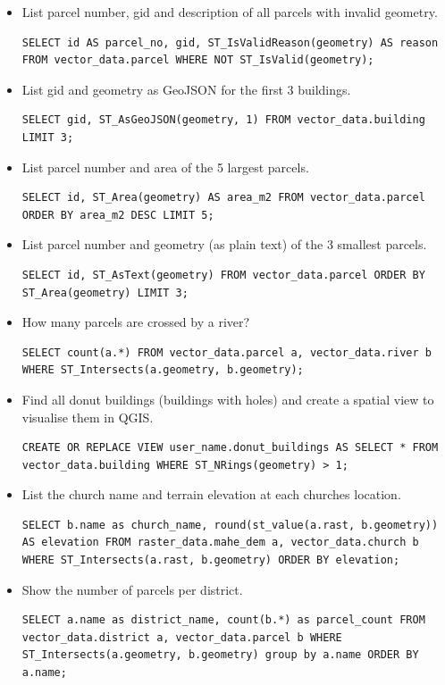 \documentclass[a4paper,12pt,titlepage]{article}
\begin{document}
\begin{itemize}
	\item List parcel number, gid and description of all parcels with invalid geometry.
\begin{lstlisting}
SELECT id AS parcel_no, gid, ST_IsValidReason(geometry) AS reason FROM vector_data.parcel WHERE NOT ST_IsValid(geometry);
\end{lstlisting}
	\item List gid and geometry as GeoJSON for the first 3 buildings.
\begin{lstlisting}
SELECT gid, ST_AsGeoJSON(geometry, 1) FROM vector_data.building LIMIT 3;
\end{lstlisting}
	\item List parcel number and area of the 5 largest parcels.
\begin{lstlisting}
SELECT id, ST_Area(geometry) AS area_m2 FROM vector_data.parcel ORDER BY area_m2 DESC LIMIT 5;
\end{lstlisting}
	\item List parcel number and geometry (as plain text) of the 3 smallest parcels.
\begin{lstlisting}
SELECT id, ST_AsText(geometry) FROM vector_data.parcel ORDER BY ST_Area(geometry) LIMIT 3;
\end{lstlisting}
	\item How many parcels are crossed by a river?
\begin{lstlisting}
SELECT count(a.*) FROM vector_data.parcel a, vector_data.river b WHERE ST_Intersects(a.geometry, b.geometry);
\end{lstlisting}
	\item Find all donut buildings (buildings with holes) and create a spatial view to visualise them in QGIS.
\begin{lstlisting}
CREATE OR REPLACE VIEW user_name.donut_buildings AS SELECT * FROM vector_data.building WHERE ST_NRings(geometry) > 1;
\end{lstlisting}
	\item List the church name and terrain elevation at each churches location.
\begin{lstlisting}
SELECT b.name as church_name, round(st_value(a.rast, b.geometry)) AS elevation FROM raster_data.mahe_dem a, vector_data.church b WHERE ST_Intersects(a.rast, b.geometry) ORDER BY elevation;
\end{lstlisting}
	\item Show the number of parcels per district.
\begin{lstlisting}
SELECT a.name as district_name, count(b.*) as parcel_count FROM vector_data.district a, vector_data.parcel b WHERE ST_Intersects(a.geometry, b.geometry) group by a.name ORDER BY a.name;
\end{lstlisting}
\end{itemize}
\end{document}
